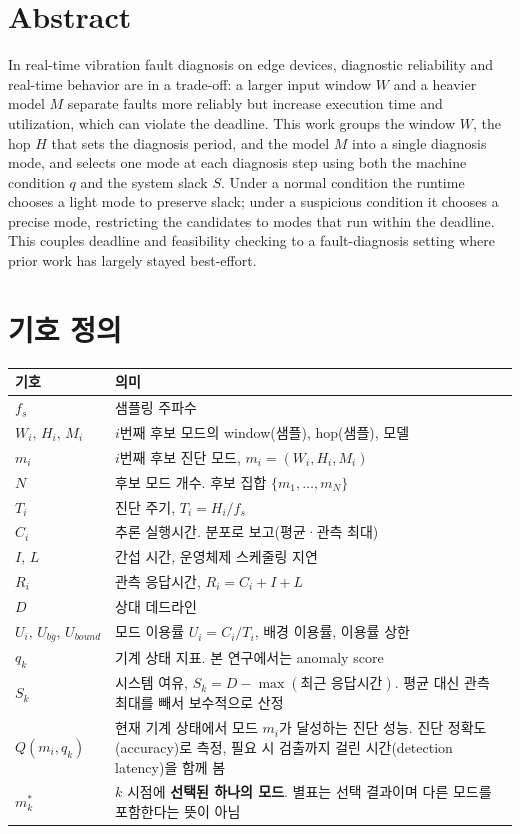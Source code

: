 \documentclass[10pt]{article}
\begin{document}
\section{Abstract}
In real-time vibration fault diagnosis on edge devices, diagnostic reliability and real-time behavior are in a trade-off: a larger input window $W$ and a heavier model $M$ separate faults more reliably but increase execution time and utilization, which can violate the deadline. This work groups the window $W$, the hop $H$ that sets the diagnosis period, and the model $M$ into a single diagnosis mode, and selects one mode at each diagnosis step using both the machine condition $q$ and the system slack $S$. Under a normal condition the runtime chooses a light mode to preserve slack; under a suspicious condition it chooses a precise mode, restricting the candidates to modes that run within the deadline. This couples deadline and feasibility checking to a fault-diagnosis setting where prior work has largely stayed best-effort.

\section{기호 정의}
\begin{center}\footnotesize
\begin{tabular}{@{}lL{11cm}@{}}
\toprule
기호 & 의미 \\ \midrule
$f_s$ & 샘플링 주파수 \\
$W_i,\,H_i,\,M_i$ & $i$번째 후보 모드의 window(샘플), hop(샘플), 모델 \\
$m_i$ & $i$번째 후보 진단 모드, $m_i=(W_i,H_i,M_i)$ \\
$N$ & 후보 모드 개수. 후보 집합 $\{m_1,\dots,m_N\}$ \\
$T_i$ & 진단 주기, $T_i=H_i/f_s$ \\
$C_i$ & 추론 실행시간. 분포로 보고(평균·관측 최대) \\
$I,\,L$ & 간섭 시간, 운영체제 스케줄링 지연 \\
$R_i$ & 관측 응답시간, $R_i=C_i+I+L$ \\
$D$ & 상대 데드라인 \\
$U_i,\,U_{bg},\,U_{bound}$ & 모드 이용률 $U_i=C_i/T_i$, 배경 이용률, 이용률 상한 \\
$q_k$ & 기계 상태 지표. 본 연구에서는 anomaly score \\
$S_k$ & 시스템 여유, $S_k=D-\max(\text{최근 응답시간})$. 평균 대신 관측 최대를 빼서 보수적으로 산정 \\
$Q(m_i,q_k)$ & 현재 기계 상태에서 모드 $m_i$가 달성하는 진단 성능. 진단 정확도(accuracy)로 측정, 필요 시 검출까지 걸린 시간(detection latency)을 함께 봄 \\
$m^{*}_k$ & $k$ 시점에 \textbf{선택된 하나의 모드}. 별표는 선택 결과이며 다른 모드를 포함한다는 뜻이 아님 \\
\bottomrule
\end{tabular}
\end{center}
\end{document}
